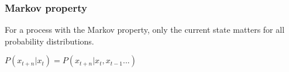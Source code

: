 
\subsubsection{Markov property}

For a process with the Markov property, only the current state matters for all probability distributions.

\(P(x_{t+n}|x_t)=P(x_{t+n}|x_t, x_{t-1}...)\)

